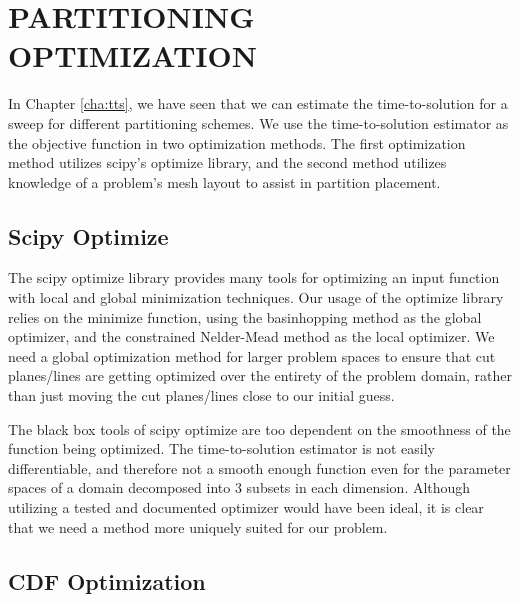 %
%
%
%



\chapter{PARTITIONING OPTIMIZATION \label{cha:optimization}}
In Chapter \ref{cha:tts}, we have seen that we can estimate the time-to-solution for a sweep for different partitioning schemes.
We use the time-to-solution estimator as the objective function in two optimization methods.
The first optimization method utilizes scipy's optimize library, and the second method utilizes knowledge of a problem's mesh layout to assist in partition placement.
\section{Scipy Optimize}
The scipy optimize library \cite{scipy} provides many tools for optimizing an input function with local and global minimization techniques.
Our usage of the optimize library relies on the minimize function, using the basinhopping \cite{basinhoppingwales} method as the global optimizer, and the constrained Nelder-Mead method as the local optimizer.
We need a global optimization method for larger problem spaces to ensure that cut planes/lines are getting optimized over the entirety of the problem domain, rather than just moving the cut planes/lines close to our initial guess.

The black box tools of scipy optimize are too dependent on the smoothness of the function being optimized.
The time-to-solution estimator is not easily differentiable, and therefore not a smooth enough function even for the parameter spaces of a domain decomposed into 3 subsets in each dimension.
Although utilizing a tested and documented optimizer would have been ideal, it is clear that we need a method more uniquely suited for our problem.

\section{CDF Optimization}

